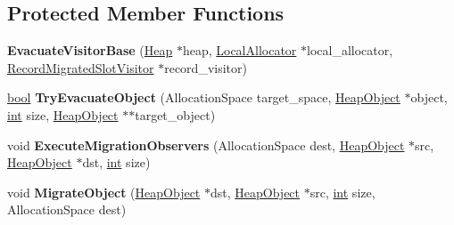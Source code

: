 \subsection*{Protected Member Functions}
\begin{DoxyCompactItemize}
\item 
\mbox{\label{classv8_1_1internal_1_1EvacuateVisitorBase_a1998baffb4a84bbe1131d7c96b47f9e3}} 
{\bfseries Evacuate\+Visitor\+Base} (\mbox{\hyperlink{classv8_1_1internal_1_1Heap}{Heap}} $\ast$heap, \mbox{\hyperlink{classv8_1_1internal_1_1LocalAllocator}{Local\+Allocator}} $\ast$local\+\_\+allocator, \mbox{\hyperlink{classv8_1_1internal_1_1RecordMigratedSlotVisitor}{Record\+Migrated\+Slot\+Visitor}} $\ast$record\+\_\+visitor)
\item 
\mbox{\label{classv8_1_1internal_1_1EvacuateVisitorBase_ab95fdf1eafaf2fbbd8a7e739317c2ce4}} 
\mbox{\hyperlink{classbool}{bool}} {\bfseries Try\+Evacuate\+Object} (Allocation\+Space target\+\_\+space, \mbox{\hyperlink{classv8_1_1internal_1_1HeapObject}{Heap\+Object}} $\ast$object, \mbox{\hyperlink{classint}{int}} size, \mbox{\hyperlink{classv8_1_1internal_1_1HeapObject}{Heap\+Object}} $\ast$$\ast$target\+\_\+object)
\item 
\mbox{\label{classv8_1_1internal_1_1EvacuateVisitorBase_a380b0191f4cbca39d188c30f6669fa91}} 
void {\bfseries Execute\+Migration\+Observers} (Allocation\+Space dest, \mbox{\hyperlink{classv8_1_1internal_1_1HeapObject}{Heap\+Object}} $\ast$src, \mbox{\hyperlink{classv8_1_1internal_1_1HeapObject}{Heap\+Object}} $\ast$dst, \mbox{\hyperlink{classint}{int}} size)
\item 
\mbox{\label{classv8_1_1internal_1_1EvacuateVisitorBase_a16e82cad517d23dd3fe4cce573fe1b5d}} 
void {\bfseries Migrate\+Object} (\mbox{\hyperlink{classv8_1_1internal_1_1HeapObject}{Heap\+Object}} $\ast$dst, \mbox{\hyperlink{classv8_1_1internal_1_1HeapObject}{Heap\+Object}} $\ast$src, \mbox{\hyperlink{classint}{int}} size, Allocation\+Space dest)
\end{DoxyCompactItemize}
